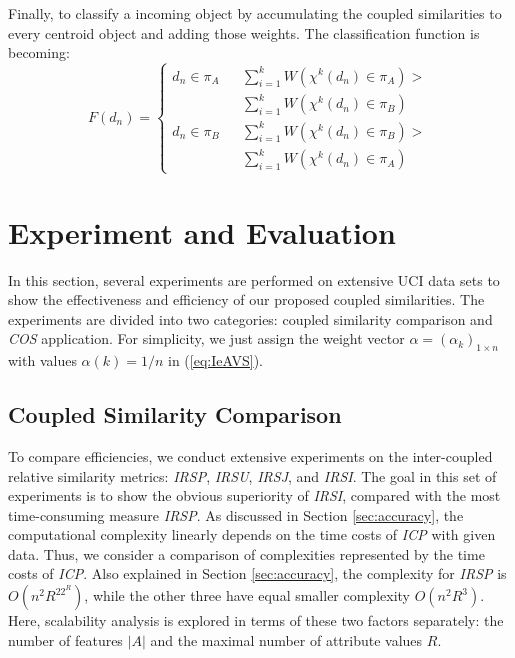\documentclass{article}
\numberwithin{equation}{section}
\begin{document}
Finally, to classify a incoming object by accumulating the coupled similarities to every centroid object and adding those weights. The classification function is becoming:
  \begin{equation}
   F(d_{n})=\left\{
\begin{aligned}
d_{n}\in \pi_{A} &    &  \sum_{i=1}^{k}W(\chi^{k}(d_n)\in\pi_{A})>  \\
&&\sum_{i=1}^{k}W(\chi^{k}(d_n)\in\pi_{B})\\
d_{n}\in \pi_{B} &    &   \sum_{i=1}^{k}W(\chi^{k}(d_n)\in\pi_{B})>  \\
&&\sum_{i=1}^{k}W(\chi^{k}(d_n)\in\pi_{A})
\end{aligned}
\right.
 \end{equation}

\section{Experiment and Evaluation}
In this section, several experiments are performed on extensive UCI data sets to show the effectiveness and efficiency of our proposed coupled similarities. The experiments are divided into two categories: coupled similarity comparison and \emph{COS} application. For simplicity, we just assign the weight vector $\alpha=(\alpha_k)_{1\times n}$ with values $\alpha(k)=1/n$ in (\ref{eq:IeAVS}).

\subsection{Coupled Similarity Comparison}
 To compare efficiencies, we conduct extensive experiments on the inter-coupled relative similarity metrics: \emph{IRSP}, \emph{IRSU}, \emph{IRSJ}, and \emph{IRSI}. The goal in this set of experiments is to show the obvious superiority of \emph{IRSI}, compared with the most time-consuming measure \emph{IRSP}. As discussed in Section \ref{sec:accuracy}, the computational complexity linearly depends on the time costs of \emph{ICP} with given data. Thus, we consider a comparison of complexities represented by the time costs of \emph{ICP}. Also explained in Section \ref{sec:accuracy}, the complexity for \emph{IRSP} is $O(n^2R^22^R)$, while the other three have equal smaller complexity $O(n^2R^3)$. Here, scalability analysis is explored in terms of these two factors separately: the number of features $|A|$ and the maximal number of attribute values $R$.
\end{document}
